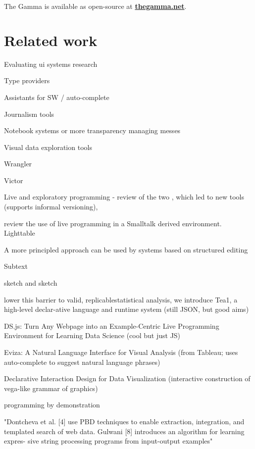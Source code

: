\documentclass{sigchi}
\begin{document}
The Gamma is available as open-source at \href{http://thegamma.net}{\small\bf\ttfamily thegamma.net}.

\section{Related work}

Evaluating ui systems research
\cite{evaluating}

Type providers
\cite{inforich,fsdata,dotdriven}

Assistants for SW / auto-complete
\cite{assistants}

Journalism tools
\cite{idyll}

Notebook systems
\cite{jupyter} or more transparency \cite{wrattler}
managing messes \cite{messes}

Visual data exploration tools
\cite{control,tableau,vizdom}

Wrangler
\cite{wrangler}

Victor
\cite{learnable,principle}

Live and exploratory programming
\cite{review} - review of the two
\cite{exploratory}, which led to new tools~\cite{variolite} (supports informal versioning),


\cite{liveroad}
review the use of live programming in a Smalltalk derived environment. Lighttable~\cite{lighttable}

A more principled approach can be used by systems based on structured editing~\cite{structure-based,livenut,lamdu}

Subtext
\cite{subtext,directprog}

sketch and sketch
\cite{sketchnsketch}

lower this barrier to valid, replicablestatistical analysis, we introduce Tea1, a high-level declar-ative language and runtime system
(still JSON, but good aims)
\cite{tea}

DS.js: Turn Any Webpage into an Example-Centric Live Programming Environment for Learning Data Science
(cool but just JS)
\cite{dsjs}

Eviza: A Natural Language Interface for Visual Analysis
(from Tableau; uses auto-complete to suggest natural language phrases)
\cite{eviza}

Declarative Interaction Design for Data Visualization
(interactive construction of vega-like grammar of graphics)
\cite{interactionviz}

programming by demonstration
\cite{watch}

"Dontcheva et al. [4] use PBD techniques to enable
extraction, integration, and templated search of web data.
Gulwani [8] introduces an algorithm for learning expres-
sive string processing programs from input-output examples"
\end{document}
